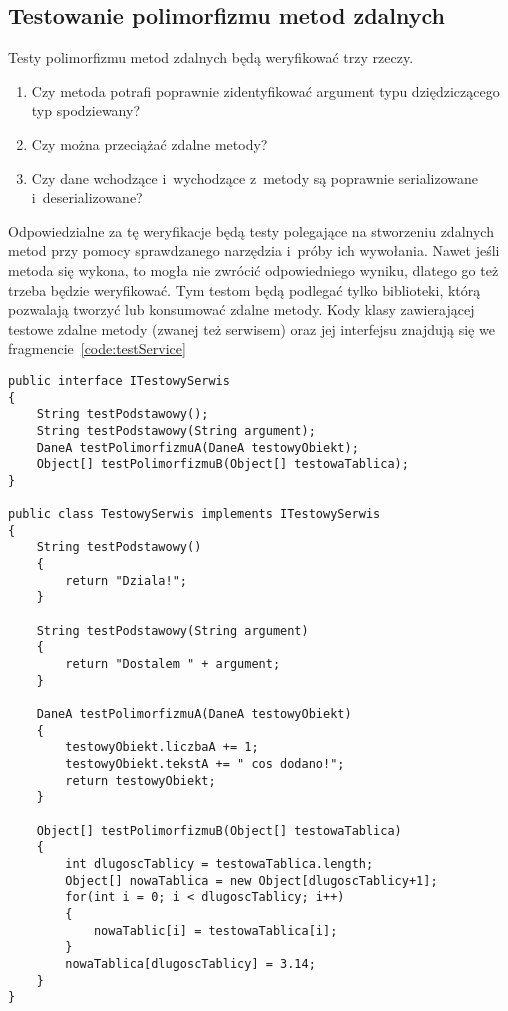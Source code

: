 \subsection{Testowanie polimorfizmu metod zdalnych}
Testy polimorfizmu metod zdalnych będą weryfikować trzy rzeczy.
\begin{enumerate}
	\item Czy metoda potrafi poprawnie zidentyfikować argument typu dziędziczącego typ spodziewany?
	\item Czy można przeciążać zdalne metody?
	\item Czy dane wchodzące i~wychodzące z~metody są poprawnie serializowane i~deserializowane?
\end{enumerate}

Odpowiedzialne za tę weryfikacje będą testy polegające na stworzeniu zdalnych metod przy pomocy sprawdzanego narzędzia i~próby ich wywołania.
Nawet jeśli metoda się wykona, to mogła nie zwrócić odpowiedniego wyniku, dlatego go też trzeba będzie weryfikować.
Tym testom będą podlegać tylko biblioteki, którą pozwalają tworzyć lub konsumować zdalne metody.
Kody klasy zawierającej testowe zdalne metody (zwanej też serwisem) oraz jej interfejsu znajdują się we fragmencie~\ref{code:testService}

\begin{lstlisting}[float, frame=single, caption={Przykładowa zdalna metoda testowana pod kątem polimorfizmu}, label=code:testService]
public interface ITestowySerwis
{
    String testPodstawowy();
    String testPodstawowy(String argument);    
    DaneA testPolimorfizmuA(DaneA testowyObiekt);    
    Object[] testPolimorfizmuB(Object[] testowaTablica);
}

public class TestowySerwis implements ITestowySerwis
{
    String testPodstawowy()
    {
        return "Dziala!";
    }
        
    String testPodstawowy(String argument)
    {
        return "Dostalem " + argument;
    }
    
    DaneA testPolimorfizmuA(DaneA testowyObiekt)
    {
        testowyObiekt.liczbaA += 1;
        testowyObiekt.tekstA += " cos dodano!";
        return testowyObiekt;
    }
    
    Object[] testPolimorfizmuB(Object[] testowaTablica)
    {
        int dlugoscTablicy = testowaTablica.length;
        Object[] nowaTablica = new Object[dlugoscTablicy+1];
        for(int i = 0; i < dlugoscTablicy; i++)
        {
            nowaTablic[i] = testowaTablica[i];
        }
        nowaTablica[dlugoscTablicy] = 3.14;
    }
}
\end{lstlisting}



